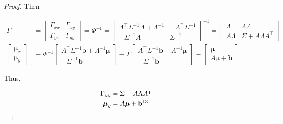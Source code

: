 \begin{proof}
    Then

    \begin{align}
        \Gamma&=\left[\begin{array}{cc}
                         \Gamma_{xx}&\Gamma_{xy}\\
                         \Gamma_{yx}&\Gamma_{yy}
                     \end{array}\right]=
        \Phi^{-1}=\left[\begin{array}{cc}
                                    A^\intercal\Sigma^{-1}A+\Lambda^{-1}&-A^\intercal\Sigma^{-1}\\
                                    -\Sigma^{-1}A&\Sigma^{-1}
                                \end{array}\right]^{-1}
                        =\left[\begin{array}{cc}
                            \Lambda&\Lambda A\\
                                    A\Lambda&\Sigma+A\Lambda A^\intercal
                                \end{array}\right]\label{eq:Gamma_final}\\
        \left[\begin{array}{c}\boldsymbol{\mu}_x\\\boldsymbol{\mu}_y\end{array}\right]&=
            \Phi^{-1}\left[\begin{array}{c}
                      A^\intercal\Sigma^{-1}\mathbf{b}+\Lambda^{-1}\boldsymbol{\mu}\\
                      -\Sigma^{-1}\mathbf{b}
                  \end{array}\right]=
            \Gamma\left[\begin{array}{c}
                      A^\intercal\Sigma^{-1}\mathbf{b}+\Lambda^{-1}\boldsymbol{\mu}\\
                      -\Sigma^{-1}\mathbf{b}
                  \end{array}\right]
                  =\left[\begin{array}{c}
                              \boldsymbol{\mu}\\
                              A\boldsymbol{\mu}+\mathbf{b}
                          \end{array}\right]\nonumber
    \end{align}

    Thus,

    \begin{align*}
        \Gamma_{yy}&=\Sigma+A\Lambda A^\intercal\\
        \boldsymbol{\mu}_y&=A\boldsymbol{\mu}+\mathbf{b}\footnotemark[13]
    \end{align*}

\end{proof}
